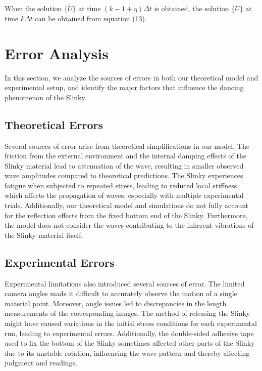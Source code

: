\documentclass{mcmthesis}  %
\begin{document}
When the solution $\{\tilde{U}\}$ at time $(k - 1 + \eta)\Delta t$ is obtained, the solution $\{U\}$ at time $k\Delta t$ can be obtained from equation (13).

\section{Error Analysis}
In this section, we analyze the sources of errors in both our theoretical model and experimental setup, and identify the major factors that influence the dancing phenomenon of the Slinky.

\subsection{Theoretical Errors}
Several sources of error arise from theoretical simplifications in our model. The friction from the external environment and the internal damping effects of the Slinky material lead to attenuation of the wave, resulting in smaller observed wave amplitudes compared to theoretical predictions. The Slinky experiences fatigue when subjected to repeated stress, leading to reduced local stiffness, which affects the propagation of waves, especially with multiple experimental trials. Additionally, our theoretical model and simulations do not fully account for the reflection effects from the fixed bottom end of the Slinky. Furthermore, the model does not consider the waves contributing to the inherent vibrations of the Slinky material itself.

\subsection{Experimental Errors}
Experimental limitations also introduced several sources of error. The limited camera angles made it difficult to accurately observe the motion of a single material point. Moreover, angle issues led to discrepancies in the length measurements of the corresponding images. The method of releasing the Slinky might have caused variations in the initial stress conditions for each experimental run, leading to experimental errors. Additionally, the double-sided adhesive tape used to fix the bottom of the Slinky sometimes affected other parts of the Slinky due to its unstable rotation, influencing the wave pattern and thereby affecting judgment and readings.
\end{document}

